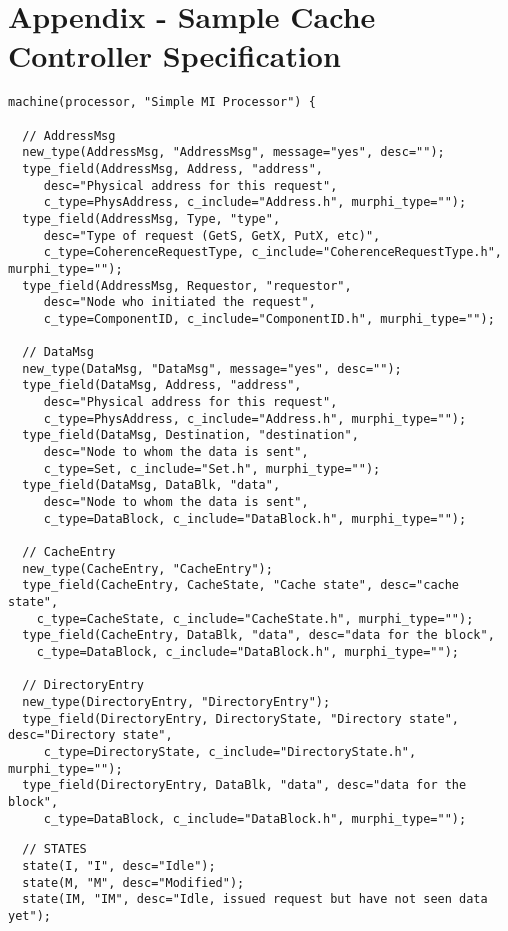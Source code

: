 \documentclass[11pt]{article}
\begin{document}
\newpage
\section*{Appendix - Sample Cache Controller Specification}

{\small 
\begin{verbatim}
machine(processor, "Simple MI Processor") {

  // AddressMsg
  new_type(AddressMsg, "AddressMsg", message="yes", desc="");
  type_field(AddressMsg, Address, "address", 
     desc="Physical address for this request", 
     c_type=PhysAddress, c_include="Address.h", murphi_type="");
  type_field(AddressMsg, Type, "type", 
     desc="Type of request (GetS, GetX, PutX, etc)",
     c_type=CoherenceRequestType, c_include="CoherenceRequestType.h", murphi_type="");
  type_field(AddressMsg, Requestor, "requestor", 
     desc="Node who initiated the request", 
     c_type=ComponentID, c_include="ComponentID.h", murphi_type="");
  
  // DataMsg
  new_type(DataMsg, "DataMsg", message="yes", desc="");
  type_field(DataMsg, Address, "address", 
     desc="Physical address for this request", 
     c_type=PhysAddress, c_include="Address.h", murphi_type="");
  type_field(DataMsg, Destination, "destination", 
     desc="Node to whom the data is sent", 
     c_type=Set, c_include="Set.h", murphi_type="");
  type_field(DataMsg, DataBlk, "data", 
     desc="Node to whom the data is sent", 
     c_type=DataBlock, c_include="DataBlock.h", murphi_type="");

  // CacheEntry
  new_type(CacheEntry, "CacheEntry");
  type_field(CacheEntry, CacheState, "Cache state", desc="cache state",
    c_type=CacheState, c_include="CacheState.h", murphi_type="");
  type_field(CacheEntry, DataBlk, "data", desc="data for the block", 
    c_type=DataBlock, c_include="DataBlock.h", murphi_type="");

  // DirectoryEntry
  new_type(DirectoryEntry, "DirectoryEntry");
  type_field(DirectoryEntry, DirectoryState, "Directory state", desc="Directory state",
     c_type=DirectoryState, c_include="DirectoryState.h", murphi_type="");
  type_field(DirectoryEntry, DataBlk, "data", desc="data for the block", 
     c_type=DataBlock, c_include="DataBlock.h", murphi_type="");

\end{verbatim}
\newpage
\begin{verbatim}
  // STATES
  state(I, "I", desc="Idle");
  state(M, "M", desc="Modified");
  state(IM, "IM", desc="Idle, issued request but have not seen data yet");


\end{verbatim}}
\end{document}
